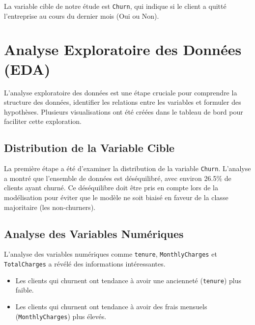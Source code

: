 La variable cible de notre étude est \texttt{Churn}, qui indique si le client a quitté l'entreprise au cours du dernier mois (Oui ou Non).

\section{Analyse Exploratoire des Données (EDA)}
L'analyse exploratoire des données est une étape cruciale pour comprendre la structure des données, identifier les relations entre les variables et formuler des hypothèses. Plusieurs visualisations ont été créées dans le tableau de bord pour faciliter cette exploration.

\subsection{Distribution de la Variable Cible}
La première étape a été d'examiner la distribution de la variable \texttt{Churn}.
L'analyse a montré que l'ensemble de données est déséquilibré, avec environ 26.5\% de clients ayant churné. Ce déséquilibre doit être pris en compte lors de la modélisation pour éviter que le modèle ne soit biaisé en faveur de la classe majoritaire (les non-churners).

\subsection{Analyse des Variables Numériques}
L'analyse des variables numériques comme \texttt{tenure}, \texttt{MonthlyCharges} et \texttt{TotalCharges} a révélé des informations intéressantes.
\begin{itemize}
    \item Les clients qui churnent ont tendance à avoir une ancienneté (\texttt{tenure}) plus faible.
    \item Les clients qui churnent ont tendance à avoir des frais mensuels (\texttt{MonthlyCharges}) plus élevés.
\end{itemize}


